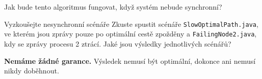 \documentclass[usenames,dvipsnames,9pt]{beamer}
\begin{document}
{
\begin{frame}
\begin{center}
\Large Jak bude tento algoritmus fungovat, když systém nebude synchronní?
\end{center}

 \pause\vspace{2em}

  \begin{block}{Vyzkoušejte nesynchronní scénáře}
    Zkuste spustit scénáře \texttt{SlowOptimalPath.java}, ve kterém jsou zprávy pouze po optimální cestě zpožděny a \texttt{FailingNode2.java}, kdy se zprávy procesu 2 ztrácí. Jaké jsou výsledky jednotlivých scénářů?
  \end{block}

  \pause\vspace{2em}

\faWarning \hspace{3pt}
  \textbf{Nemáme žádné garance.} Výsledek nemusí být optimální, dokonce ani nemusí nikdy doběhnout.

\end{frame}
}

\framefeedback{}
\end{document}
